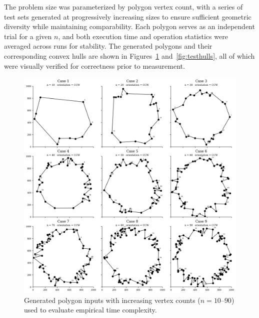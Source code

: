 \documentclass{article}
\begin{document}
The problem size was parameterized by polygon vertex count, with a series of test sets generated at progressively increasing sizes to ensure sufficient geometric diversity while maintaining comparability.  
Each polygon serves as an independent trial for a given \(n\), and both execution time and operation statistics were averaged across runs for stability.  
The generated polygons and their corresponding convex hulls are shown in Figures~\ref{fig:testpolys} and~\ref{fig:testhulls}, all of which were visually verified for correctness prior to measurement.

\begin{figure}[H]
    \centering
    \includegraphics[width=0.95\linewidth]{Pictures/test_polygon_cases.png}
    \caption{Generated polygon inputs with increasing vertex counts ($n=10$–$90$) used to evaluate empirical time complexity.}
    \label{fig:testpolys}
\end{figure}
\end{document}
